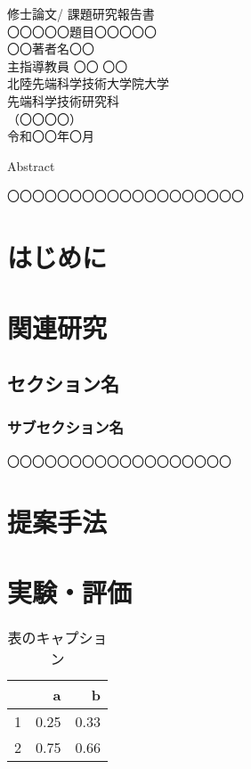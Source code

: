\documentclass[12pt,a4j,book]{jlreq}
\begin{document}
        
    \thispagestyle{empty}
    \begin{center}
    修士論文/ 課題研究報告書\\%
    \vfill
    〇〇〇〇〇題目〇〇〇〇〇\\
    \vfill
    〇〇著者名〇〇\\
    \vfill
    主指導教員  〇〇 〇〇\\
    \vfill
    北陸先端科学技術大学院大学\\
    先端科学技術研究科\\
    （〇〇〇〇）\\ %
    \vfill
    令和〇〇年〇月\\ %
    \vfill
    \end{center}
    \clearpage
    \centerline{Abstract}
    〇〇〇〇〇〇〇〇〇〇〇〇〇〇〇〇〇〇〇
    \clearpage
    \tableofcontents\thispagestyle{empty}%
    \listoffigures\thispagestyle{empty}%
    \listoftables\thispagestyle{empty}%
    \clearpage
    
    \chapter{はじめに}
    
    \chapter{関連研究}
    \section{セクション名}
    \subsection{サブセクション名}
    〇〇〇〇〇〇〇〇〇〇〇〇〇〇〇〇〇〇
    \chapter{提案手法}
    
    \chapter{実験・評価}
    \begin{table}
    \centering
    \begin{tabular}{r|rr}
    & a & b\\ \hline
    1& 0.25 & 0.33\\
    2& 0.75 & 0.66\\
    \end{tabular}
    \caption{表のキャプション}\label{table1}
    \end{table}
\end{document}
